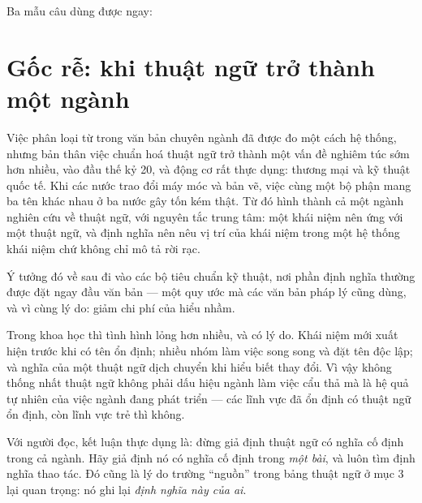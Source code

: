 \documentclass[../../english.tex]{subfiles}
\begin{document}
Ba mẫu câu dùng được ngay:

\begin{mauau}
\end{mauau}

\section{Gốc rễ: khi thuật ngữ trở thành một ngành}

Việc phân loại từ trong văn bản chuyên ngành đã được đo một cách hệ thống\cite{chungnation2003}, nhưng bản thân việc chuẩn hoá thuật ngữ trở thành một vấn đề nghiêm túc sớm hơn nhiều, vào đầu thế kỷ 20, và động cơ rất thực dụng: thương mại và kỹ thuật quốc tế. Khi các nước trao đổi máy móc và bản vẽ, việc cùng một bộ phận mang ba tên khác nhau ở ba nước gây tốn kém thật. Từ đó hình thành cả một ngành nghiên cứu về thuật ngữ, với nguyên tắc trung tâm: một khái niệm nên ứng với một thuật ngữ, và định nghĩa nên nêu vị trí của khái niệm trong một hệ thống khái niệm chứ không chỉ mô tả rời rạc.

Ý tưởng đó về sau đi vào các bộ tiêu chuẩn kỹ thuật, nơi phần định nghĩa thường được đặt ngay đầu văn bản --- một quy ước mà các văn bản pháp lý cũng dùng, và vì cùng lý do: giảm chi phí của hiểu nhầm.

Trong khoa học thì tình hình lỏng hơn nhiều, và có lý do. Khái niệm mới xuất hiện trước khi có tên ổn định; nhiều nhóm làm việc song song và đặt tên độc lập; và nghĩa của một thuật ngữ dịch chuyển khi hiểu biết thay đổi. Vì vậy không thống nhất thuật ngữ không phải dấu hiệu ngành làm việc cẩu thả mà là hệ quả tự nhiên của việc ngành đang phát triển --- các lĩnh vực đã ổn định có thuật ngữ ổn định, còn lĩnh vực trẻ thì không.

Với người đọc, kết luận thực dụng là: đừng giả định thuật ngữ có nghĩa cố định trong cả ngành. Hãy giả định nó có nghĩa cố định trong \emph{một bài}, và luôn tìm định nghĩa thao tác. Đó cũng là lý do trường ``nguồn'' trong bảng thuật ngữ ở mục 3 lại quan trọng: nó ghi lại \emph{định nghĩa này của ai}.
\end{document}

